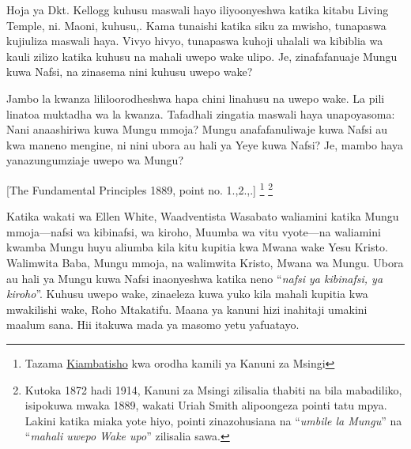 Hoja ya Dkt. Kellogg kuhusu maswali hayo iliyoonyeshwa katika kitabu Living Temple, ni. Maoni, kuhusu,. Kama tunaishi katika siku za mwisho, tunapaswa kujiuliza maswali haya. Vivyo hivyo, tunapaswa kuhoji uhalali wa kibiblia wa kauli zilizo katika  kuhusu  na mahali uwepo wake ulipo. Je,  zinafafanuaje Mungu kuwa Nafsi, na zinasema nini kuhusu uwepo wake?

Jambo la kwanza lililoorodheshwa hapa chini linahusu  na uwepo wake. La pili linatoa muktadha wa la kwanza. Tafadhali zingatia maswali haya unapoyasoma: Nani anaashiriwa kuwa Mungu mmoja? Mungu anafafanuliwaje kuwa Nafsi au kwa maneno mengine, ni nini ubora au hali ya Yeye kuwa Nafsi? Je, mambo haya yanazungumziaje uwepo wa Mungu?


[The Fundamental Principles 1889, point no. 1.,2.,.] \footnote{Tazama \hyperref[chap:appendix]{Kiambatisho} kwa orodha kamili ya Kanuni za Msingi} \footnote{Kutoka 1872 hadi 1914, Kanuni za Msingi zilisalia thabiti na bila mabadiliko, isipokuwa mwaka 1889, wakati Uriah Smith alipoongeza pointi tatu mpya. Lakini katika miaka yote hiyo, pointi zinazohusiana na “\textit{umbile la Mungu}” na “\textit{mahali uwepo Wake upo}” zilisalia sawa.}

Katika wakati wa Ellen White, Waadventista Wasabato waliamini katika Mungu mmoja—nafsi wa kibinafsi, wa kiroho, Muumba wa vitu vyote—na waliamini kwamba Mungu huyu aliumba kila kitu kupitia kwa Mwana wake Yesu Kristo. Walimwita Baba, Mungu mmoja, na walimwita Kristo, Mwana wa Mungu. Ubora au hali ya Mungu kuwa Nafsi inaonyeshwa katika neno “\textit{nafsi ya kibinafsi, ya kiroho}”. Kuhusu uwepo wake,  zinaeleza kuwa yuko kila mahali kupitia kwa mwakilishi wake, Roho Mtakatifu. Maana ya kanuni hizi inahitaji umakini maalum sana. Hii itakuwa mada ya masomo yetu yafuatayo.


